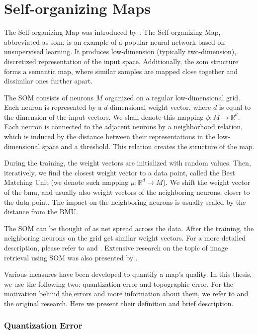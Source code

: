 \section{Self-organizing Maps}
\label{s:som}

The Self-organizing Map was introduced by \cite{kohonen1982self}. The Self-organizing Map, abbreviated as \acrshort{som}, is an example of a popular neural network based on unsupervised learning.  It produces low-dimension (typically two-dimension), discretized representation of the input space. Additionally, the \acrlong{som} structure forms a semantic map, where similar samples are mapped close together and dissimilar ones further apart.

The SOM consists of neurons $M$ organized on a regular low-dimensional grid. Each neuron is represented by a $d$-dimensional weight vector, where $d$ is equal to the dimension of the input vectors. We shall denote this mapping $\phi: M \rightarrow \mathbb{R}^d$. Each neuron is connected to the adjacent neurons by a neighborhood relation, which is induced by the distance between their representations in the low-dimensional space and a threshold. This relation creates the structure of the map. 

During the training, the weight vectors are initialized with random values. Then, iteratively, we find the closest weight vector to a data point, called the Best Matching Unit (we denote such mapping $\mu: \mathbb{R}^d \rightarrow M$). We shift the weight vector of the \acrshort{bmu}, and usually also weight vectors of the neighboring neurons, closer to the data point. The impact on the neighboring neurons is usually scaled by the distance from the BMU.

The SOM can be thought of as net spread across the data. After the training, the neighboring neurons on the grid get similar weight vectors. For a more detailed description, please refer to \cite{kohonen1982self} and \cite{kohonen2007kohonen}. Extensive research on the topic of image retrieval using SOM was also presented by \cite{koskela2003interactive}.

Various measures have been developed to quantify a map's quality. In this thesis, we use the following two: quantization error and topographic error. For the motivation behind the errors and more information about them, we refer to \cite{breard2017evaluating} and the original research. Here we present their definition and brief description.

\subsubsection*{Quantization Error}

